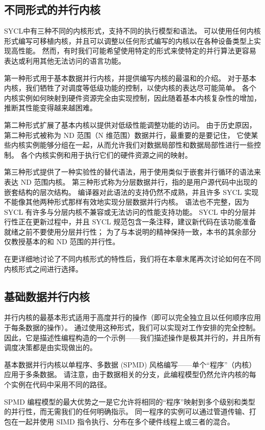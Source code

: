 \subsection{不同形式的并行内核}
SYCL中有三种不同的内核形式，支持不同的执行模型和语法。 
可以使用任何内核形式编写可移植内核，并且可以调整以任何形式编写的内核以在各种设备类型上实现高性能。 
然而，有时我们可能希望使用特定的形式来使特定的并行算法更容易表达或利用其他无法访问的语言功能。

第一种形式用于基本数据并行内核，并提供编写内核的最温和的介绍。 
对于基本内核，我们牺牲了对调度等低级功能的控制，以使内核的表达尽可能简单。 
各个内核实例如何映射到硬件资源完全由实现控制，因此随着基本内核复杂性的增加，推断其性能变得越来越困难。

第二种形式扩展了基本内核以提供对低级性能调整功能的访问。 
由于历史原因，第二种形式被称为 ND 范围（N 维范围）数据并行，最重要的是要记住，
它使某些内核实例能够分组在一起，从而允许我们对数据局部性和数据局部性进行一些控制。 
各个内核实例和用于执行它们的硬件资源之间的映射。

第三种形式提供了一种实验性的替代语法，用于使用类似于嵌套并行循环的语法来表达 ND 范围内核。 
第三种形式称为分层数据并行，指的是用户源代码中出现的嵌套结构的层次结构。 
编译器对此语法的支持仍然不成熟，并且许多 SYCL 实现不能像其他两种形式那样有效地实现分层数据并行内核。 
语法也不完整，因为 SYCL 有许多与分层内核不兼容或无法访问的性能支持功能。 
SYCL 中的分层并行性正在更新过程中，并且 SYCL 规范包含一条注释，建议新代码在该功能准备就绪之前不要使用分层并行性； 
为了与本说明的精神保持一致，本书的其余部分仅教授基本的和 ND 范围的并行性。

在更详细地讨论了不同内核形式的特性后，我们将在本章末尾再次讨论如何在不同内核形式之间进行选择。

\subsection{基础数据并行内核}
并行内核的最基本形式适用于高度并行的操作（即可以完全独立且以任何顺序应用于每条数据的操作）。 
通过使用这种形式，我们可以实现对工作安排的完全控制。 
因此，它是描述性编程构造的一个示例——我们描述操作是极其并行的，并且所有调度决策都是由实现做出的。

基本数据并行内核以单程序、多数据 (SPMD) 风格编写——单个“程序”（内核）应用于多条数据。 
请注意，由于数据相关的分支，此编程模型仍然允许内核的每个实例在代码中采用不同的路径。

SPMD 编程模型的最大优势之一是它允许将相同的“程序”映射到多个级别和类型的并行性，而无需我们的任何明确指示。 
同一程序的实例可以通过管道传输、打包在一起并使用 SIMD 指令执行、分布在多个硬件线程上或三者的混合。

